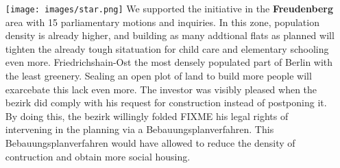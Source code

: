 \documentclass[a4paper,10pt]{article}
\begin{document}
\begin{itemize}
\itemsep1pt\parskip0pt
\item[\texttt{[image: images/star.png]}]
  We supported the initiative in the \textbf{Freudenberg} area with 15 parliamentary motions and inquiries. In this zone, population density is already higher, and building as many addtional flats as planned will tighten the already tough sitatuation for child care and elementary schooling even more. Friedrichshain-Ost the most densely populated part of Berlin with the least greenery. Sealing an open plot of land to build more people will exarcebate this lack even more. 
  The investor was visibly pleased when the bezirk did comply with his request for construction instead of postponing it. By doing this, the bezirk willingly folded FIXME his legal rights of intervening in the planning via a Bebauungsplanverfahren. This Bebauungsplanverfahren would have allowed to reduce the density of contruction and obtain more social housing.
  

\end{itemize}
\end{document}
